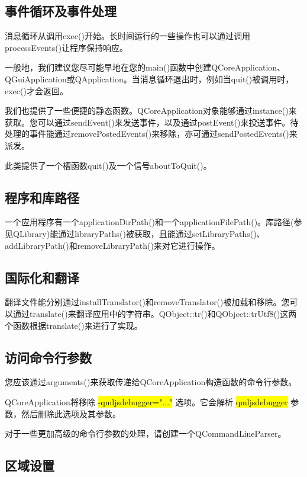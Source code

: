 \subsection{事件循环及事件处理}

消息循环从调用exec()开始。长时间运行的一些操作也可以通过调用processEvents()让程序保持响应。

一般地，我们建议您尽可能早地在您的main()函数中创建QCoreApplication、QGuiApplication或QApplication。当消息循环退出时，例如当quit()被调用时，exec()才会返回。

我们也提供了一些便捷的静态函数。QCoreApplication对象能够通过instance()来获取。您可以通过sendEvent()来发送事件，以及通过postEvent()来投送事件。待处理的事件能通过removePostedEvents()来移除，亦可通过sendPostedEvents()来派发。

此类提供了一个槽函数quit()及一个信号aboutToQuit()。

\subsection{程序和库路径}

一个应用程序有一个applicationDirPath()和一个applicationFilePath()。库路径(参见QLibrary)能通过libraryPaths()被获取，且能通过setLibraryPaths()、addLibraryPath()和removeLibraryPath()来对它进行操作。

\subsection{国际化和翻译}

翻译文件能分别通过installTranslator()和removeTranslator()被加载和移除。您可以通过translate()来翻译应用中的字符串。QObject::tr()和QObject::trUtf8()这两个函数根据translate()来进行了实现。

\subsection{访问命令行参数}

您应该通过arguments()来获取传递给QCoreApplication构造函数的命令行参数。

\begin{notice}
	QCoreApplication将移除 \hl{-qmljsdebugger="..."} 选项。它会解析
\hl{qmljsdebugger} 参数，然后删除此选项及其参数。
\end{notice}


对于一些更加高级的命令行参数的处理，请创建一个QCommandLineParser。

\subsection{区域设置}

